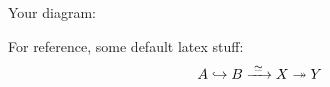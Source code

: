 \documentclass[a4paper, 12pt]{amsart}
\begin{document}
Your diagram:

For reference, some default latex stuff:
$$ A \hookrightarrow B \xrightarrow{\,\,{\simeq}\,\,} X \twoheadrightarrow Y $$
\end{document}
